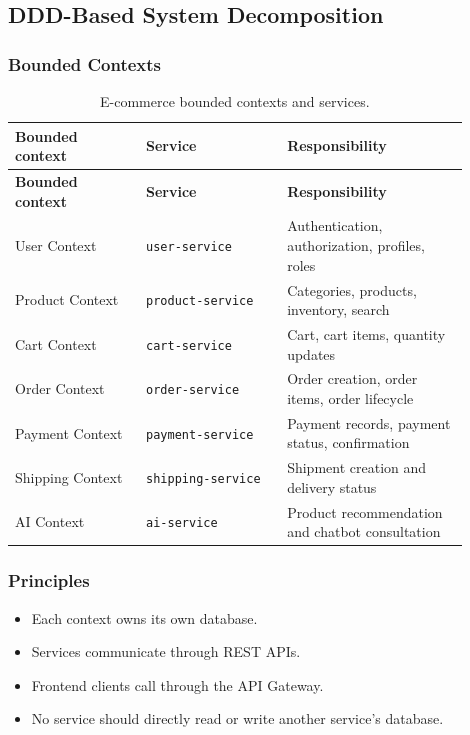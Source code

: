 \documentclass[12pt,a4paper]{article}
\newcommand{\codepath}[1]{\texttt{#1}}
\begin{document}
\subsection{DDD-Based System Decomposition}

\subsubsection{Bounded Contexts}

\begin{longtable}{p{0.26\linewidth}p{0.28\linewidth}p{0.36\linewidth}}
\caption{E-commerce bounded contexts and services.}
\label{tab:ecom-bounded-contexts}\\
\toprule
\textbf{Bounded context} & \textbf{Service} & \textbf{Responsibility}\\
\midrule
\endfirsthead
\toprule
\textbf{Bounded context} & \textbf{Service} & \textbf{Responsibility}\\
\midrule
\endhead
User Context & \codepath{user-service} & Authentication, authorization, profiles, roles\\
Product Context & \codepath{product-service} & Categories, products, inventory, search\\
Cart Context & \codepath{cart-service} & Cart, cart items, quantity updates\\
Order Context & \codepath{order-service} & Order creation, order items, order lifecycle\\
Payment Context & \codepath{payment-service} & Payment records, payment status, confirmation\\
Shipping Context & \codepath{shipping-service} & Shipment creation and delivery status\\
AI Context & \codepath{ai-service} & Product recommendation and chatbot consultation\\
\bottomrule
\end{longtable}

\subsubsection{Principles}

\begin{itemize}
    \item Each context owns its own database.
    \item Services communicate through REST APIs.
    \item Frontend clients call through the API Gateway.
    \item No service should directly read or write another service's database.
\end{itemize}
\end{document}
